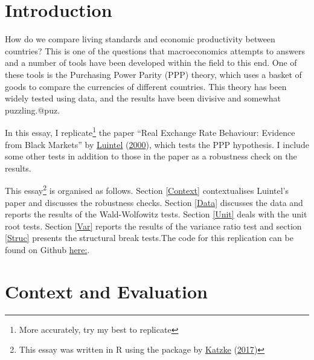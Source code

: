 \documentclass[11pt,preprint, authoryear]{elsarticle}
\numberwithin{equation}{section}
\numberwithin{figure}{section}
\numberwithin{table}{section}
\let\rmarkdownfootnote\footnote%
\def\footnote{\protect\rmarkdownfootnote}
\begin{document}
\renewcommand{\contentsname}{Table of Contents}
{\tableofcontents}

\pagestyle{fancy}
\chead{}
\rhead{}
\lfoot{}
\lhead{}
\cfoot{}


\headsep 35pt %




\hypertarget{introduction}{%
\section{\texorpdfstring{Introduction
\label{Introduction}}{Introduction }}\label{introduction}}

How do we compare living standards and economic productivity between
countries? This is one of the questions that macroeconomics attempts to
answers and a number of tools have been developed within the field to
this end. One of these tools is the Purchasing Power Parity (PPP)
theory, which uses a basket of goods to compare the currencies of
different countries. This theory has been widely tested using data, and
the results have been divisive and somewhat puzzling.@puz.

In this essay, I replicate\footnote{More accurately, try my best to
  replicate} the paper ``Real Exchange Rate Behaviour: Evidence from
Black Markets'' by \protect\hyperlink{ref-Kul}{Luintel}
(\protect\hyperlink{ref-Kul}{2000}), which tests the PPP hypothesis. I
include some other tests in addition to those in the paper as a
robustness check on the results.

This essay\footnote{This essay was written in R using the package by
  \protect\hyperlink{ref-Texevier}{Katzke}
  (\protect\hyperlink{ref-Texevier}{2017})} is organised as follows.
Section \ref{Context} contextualises Luintel's paper and discusses the
robustness checks. Section \ref{Data} discusses the data and reports the
results of the Wald-Wolfowitz tests. Section \ref{Unit} deals with the
unit root tests. Section \ref{Var} reports the results of the variance
ratio test and section \ref{Struc} presents the structural break
tests.The code for this replication can be found on Github
\href{https://github.com/cass-code/metrics.git}{here:}.

\hypertarget{context-and-evaluation}{%
\section{\texorpdfstring{Context and Evaluation
\label{Context}}{Context and Evaluation }}\label{context-and-evaluation}}
\end{document}
